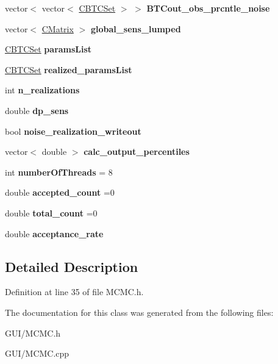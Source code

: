 \begin{DoxyCompactItemize}
vector$<$ vector$<$ \hyperlink{class_c_b_t_c_set}{C\+B\+T\+C\+Set} $>$ $>$ {\bfseries B\+T\+Cout\+\_\+obs\+\_\+prcntle\+\_\+noise}
\item 
\mbox{\label{class_c_m_c_m_c_a7fb5d70e200f103aa09e511fff99e020}} 
vector$<$ \hyperlink{class_c_matrix}{C\+Matrix} $>$ {\bfseries global\+\_\+sens\+\_\+lumped}
\item 
\mbox{\label{class_c_m_c_m_c_a26507a80e74f63a61c791d6f89d7c4a3}} 
\hyperlink{class_c_b_t_c_set}{C\+B\+T\+C\+Set} {\bfseries params\+List}
\item 
\mbox{\label{class_c_m_c_m_c_a7dd6e92b421eda02b4c48d392f64674f}} 
\hyperlink{class_c_b_t_c_set}{C\+B\+T\+C\+Set} {\bfseries realized\+\_\+params\+List}
\item 
\mbox{\label{class_c_m_c_m_c_a4a200fdb0792fb07d3165260f205da94}} 
int {\bfseries n\+\_\+realizations}
\item 
\mbox{\label{class_c_m_c_m_c_a09e362b409f942ff2959b4260243f5ea}} 
double {\bfseries dp\+\_\+sens}
\item 
\mbox{\label{class_c_m_c_m_c_abfd22a9d8308b1d3d6724b2203904cd2}} 
bool {\bfseries noise\+\_\+realization\+\_\+writeout}
\item 
\mbox{\label{class_c_m_c_m_c_a4c449b9516cf8a5e794bebd4e942bd22}} 
vector$<$ double $>$ {\bfseries calc\+\_\+output\+\_\+percentiles}
\item 
\mbox{\label{class_c_m_c_m_c_a6ffc78edf8fbdb2f809206764d717c11}} 
int {\bfseries number\+Of\+Threads} = 8
\item 
\mbox{\label{class_c_m_c_m_c_aaf5741e682c411c0b43787adc7186caf}} 
double {\bfseries accepted\+\_\+count} =0
\item 
\mbox{\label{class_c_m_c_m_c_ab41b6212a306cb1625666970d4806ed6}} 
double {\bfseries total\+\_\+count} =0
\item 
\mbox{\label{class_c_m_c_m_c_a3035005f1a116b384b46471f903e2983}} 
double {\bfseries acceptance\+\_\+rate}
\end{DoxyCompactItemize}


\subsection{Detailed Description}


Definition at line 35 of file M\+C\+M\+C.\+h.



The documentation for this class was generated from the following files\+:\begin{DoxyCompactItemize}
\item 
G\+U\+I/M\+C\+M\+C.\+h\item 
G\+U\+I/M\+C\+M\+C.\+cpp\end{DoxyCompactItemize}
